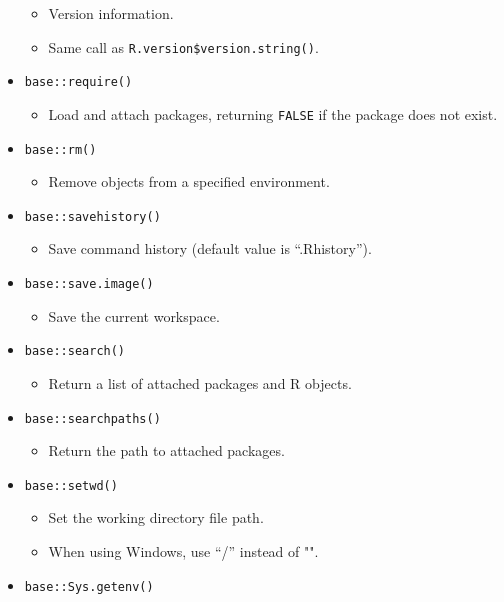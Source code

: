 \documentclass[
]{book}
\providecommand{\tightlist}{%
  \setlength{\itemsep}{0pt}\setlength{\parskip}{0pt}}
\begin{document}
\begin{itemize}
  \begin{itemize}
  \tightlist
  \item
    Version information.
  \item
    Same call as \texttt{R.version\$version.string()}.
  \end{itemize}
\item
  \texttt{base::require()}

  \begin{itemize}
  \tightlist
  \item
    Load and attach packages, returning \texttt{FALSE} if the package does not exist.
  \end{itemize}
\item
  \texttt{base::rm()}

  \begin{itemize}
  \tightlist
  \item
    Remove objects from a specified environment.
  \end{itemize}
\item
  \texttt{base::savehistory()}

  \begin{itemize}
  \tightlist
  \item
    Save command history (default value is ``.Rhistory'').
  \end{itemize}
\item
  \texttt{base::save.image()}

  \begin{itemize}
  \tightlist
  \item
    Save the current workspace.
  \end{itemize}
\item
  \texttt{base::search()}

  \begin{itemize}
  \tightlist
  \item
    Return a list of attached packages and R objects.
  \end{itemize}
\item
  \texttt{base::searchpaths()}

  \begin{itemize}
  \tightlist
  \item
    Return the path to attached packages.
  \end{itemize}
\item
  \texttt{base::setwd()}

  \begin{itemize}
  \tightlist
  \item
    Set the working directory file path.
  \item
    When using Windows, use ``/'' instead of "".
  \end{itemize}
\item
  \texttt{base::Sys.getenv()}


\end{itemize}
\end{document}
